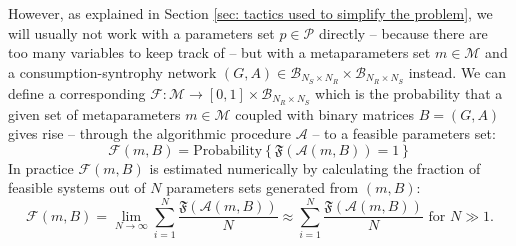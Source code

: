 \documentclass[12pt, titlepage]{report}
\begin{document}
However, as explained in Section \ref{sec: tactics used to simplify the problem}, we will usually not work with a parameters set $p \in \mathcal{P}$ directly -- because there are too many variables to keep track of -- but with a metaparameters set $m \in \mathcal{M}$ and a consumption-syntrophy network $(G,A) \in \mathcal{B}_{N_S \times N_R} \times \mathcal{B}_{N_R \times N_S}$ instead. We can  define a corresponding
 $\mathcal{F} : \mathcal{M} \rightarrow [0, 1] \times \mathcal{B}_{N_R \times N_S}$ which is the probability that a given set of metaparameters $m \in \mathcal{M}$ coupled with binary matrices $B=(G, A)$ gives rise -- through the algorithmic procedure $\mathcal{A}$ -- to a feasible parameters set:
\begin{equation}{
\mathcal{F}(m, B)=\text{Probability}\left\{\mathfrak{F}\left(\mathcal{A}(m, B)\right)=1\right\} \label{eq : feasibility methods feasibility metaparameters function}
}
\end{equation}
In practice $\mathcal{F}(m, B)$ is estimated numerically by calculating the fraction of feasible systems out of $N$ parameters sets generated from $(m,B)$:
\begin{equation}
\mathcal{F}(m, B) = \lim_{N\rightarrow \infty} \sum_{i=1}^N \frac{\mathfrak{F}(\mathcal{A}(m,B))}{N} \approx \sum_{i=1}^N \frac{\mathfrak{F}(\mathcal{A}(m,B))}{N} \text{ for } N \gg 1.
\end{equation}
\end{document}
